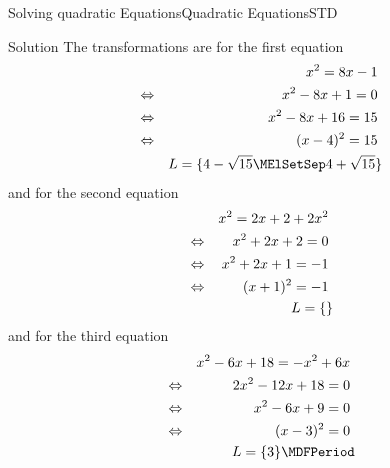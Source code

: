 \begin{MXContent}{Solving quadratic Equations}{Quadratic Equations}{STD}
\begin{MExercise}
\begin{MHint}{Solution}
The transformations are for the first equation
\begin{eqnarray*}
&&x^2=8x-1 \ \\
&\Leftrightarrow&x^2-8x+1=0 \ \\
&\Leftrightarrow&x^2-8x+16=15 \ \\
&\Leftrightarrow&(x-4)^2=15 \ \\
&& \ML=\lbrace 4-\sqrt{15}\MElSetSep 4+\sqrt{15}\rbrace
\end{eqnarray*}
and for the second equation
\begin{eqnarray*}
&&x^2=2x+2+2x^2 \ \\
&\Leftrightarrow&x^2+2x+2=0 \ \\
&\Leftrightarrow&x^2+2x+1=-1 \ \\
&\Leftrightarrow&(x+1)^2=-1\ \\
&& L=\lbrace\rbrace
\end{eqnarray*}
and for the third equation
\begin{eqnarray*}
&&x^2-6x+18=-x^2+6x \ \\
&\Leftrightarrow&2x^2-12x+18=0 \ \\
&\Leftrightarrow&x^2-6x+9=0 \ \\
&\Leftrightarrow&(x-3)^2=0\ \\
&& \ML=\lbrace3\rbrace \MDFPeriod
\end{eqnarray*}
\end{MHint}

\end{MExercise}

\end{MXContent}



